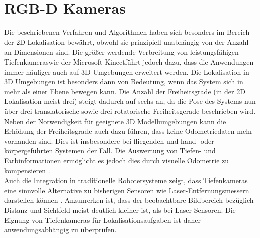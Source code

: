 \\


\\


\section{RGB-D Kameras}
Die beschriebenen Verfahren und Algorithmen haben sich besonders im Bereich der 2D Lokalisation bewährt, obwohl sie prinzipiell unabhängig von der Anzahl an Dimensionen sind. Die größer werdende Verbreitung von \red[bezahlbaren] leistungsfähigen Tiefenkameras wie der Microsoft Kinect\red[Tm] führt jedoch dazu, dass die Anwendungen immer häufiger auch auf 3D Umgebungen erweitert werden. Die Lokalisation in 3D Umgebungen ist besonders dann von Bedeutung, wenn das System sich in mehr als einer Ebene bewegen kann. Die Anzahl der Freiheitsgrade (in der 2D Lokalisation meist drei) steigt dadurch auf sechs an, da die Pose des Systems nun über drei translatorische sowie drei rotatorische Freiheitsgerade beschrieben wird. Neben der Notwendigkeit für geeignete 3D Modellumgebungen kann die Erhöhung der Freiheitsgrade auch dazu führen, dass keine Odometriedaten mehr vorhanden sind. Dies ist insbesondere bei fliegenden \cite{Huang2011} und hand- oder körpergeführten Systemen \cite{Fallon2012} der Fall. Die Auswertung von Tiefen- und Farbinformationen ermöglicht es jedoch dies durch visuelle Odometrie zu kompensieren \cite{Whelan2013robust}.\\
Auch die Integration in traditionelle Robotersysteme zeigt, dass Tiefenkameras eine sinnvolle Alternative zu bisherigen Sensoren wie Laser-Entfernungsmessern darstellen können \cite{Cunha2011} \cite{Eriksson2012}. Anzumerken ist, dass der beobachtbare Bildbereich bezüglich Distanz und Sichtfeld meist deutlich kleiner ist, als bei Laser Sensoren. Die Eignung von Tiefenkameras für Lokalisationsaufgaben ist daher anwendungsabhängig zu überprüfen.\\

